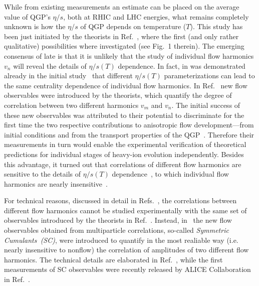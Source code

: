 While from existing measurements an estimate can be placed on the average value of QGP's $\eta/s$, both at RHIC and LHC energies, what remains completely unknown is how the $\eta/s$ of QGP depends on temperature ($T$). This study has been just initiated by the theorists in Ref.~\cite{Niemi:2015qia}, where the first (and only rather qualitative) possibilities where investigated (see Fig.~1 therein). The emerging consensus of late is that it is unlikely that the study of individual flow harmonics $v_n$ will reveal the details of $\eta/s(T)$ dependence. In fact, in was demonstrated already in the initial study~\cite{Niemi:2015qia} that different $\eta/s(T)$ parameterizations can lead to the same centrality dependence of individual flow harmonics. In Ref.~\cite{Niemi:2012aj} new flow observables were introduced by the theorists, which quantify the degree of correlation between two different harmonics $v_m$ and $v_n$. The initial success of these new observables was attributed to their potential to discriminate for the first time the two respective contributions to anisotropic flow development---from initial conditions and from the transport properties of the QGP~\cite{Niemi:2012aj}. Therefore their measurements in turn would enable the experimental verification of theoretical predictions for individual stages of heavy-ion evolution independently. Besides this advantage, it turned out that correlations of different flow harmonics are sensitive to the details of $\eta/s(T)$ dependence~\cite{ALICE:2016kpq}, to which individual flow harmonics are nearly insensitive~\cite{Niemi:2015qia}. 
 
For technical reasons, discussed in detail in Refs.~\cite{ALICE:2016kpq,Bilandzic:2013kga}, the correlations between different flow harmonics cannot be studied experimentally with the same set of observables introduced by the theorists in Ref.~\cite{Niemi:2012aj}. 
Instead, in~\cite{Bilandzic:2013kga} the new flow observables obtained from multiparticle correlations, so-called \textit{Symmetric Cumulants~(SC)}, were introduced to quantify in the most realiable way (i.e. nearly insensitive to nonflow) the correlation of amplitudes of two different flow harmonics.
The technical details are elaborated in Ref.~\cite{Bilandzic:2013kga}, while the first measurements of SC observables were recently released by ALICE Collaboration in Ref.~\cite{ALICE:2016kpq}.

